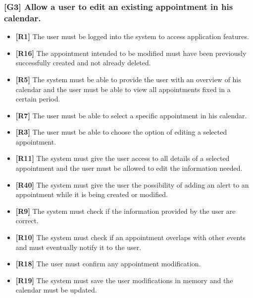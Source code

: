 \subsubsection{[G3] Allow a user to edit an existing appointment in his calendar.}
\begin{itemize}
	\item \textbf{[R1]} The user must be logged into the system to access application features.
	\item \textbf{[R16]} The appointment intended to be modified must have been previously successfully created and not already deleted.
	\item \textbf{[R5]} The system must be able to provide the user with an overview of his calendar and the user must be able to view all appointments fixed in a certain period.
	\item \textbf{[R7]} The user must be able to select a specific appointment in his calendar.
	\item \textbf{[R3]} The user must be able to choose the option of editing a selected appointment.
	\item \textbf{[R11]} The system must give the user access to all details of a selected appointment and the user must be allowed to edit the information needed.
	\item \textbf{[R40]} The system must give the user the possibility of adding an alert to an appointment while it is being created or modified.
	\item \textbf{[R9]} The system must check if the information provided by the user are correct.
	\item \textbf{[R10]} The system must check if an appointment overlaps with other events and must eventually notify it to the user.
	\item \textbf{[R18]} The user must confirm any appointment modification.
	\item \textbf{[R19]} The system must save the user modifications in memory and the calendar must be updated.
\end{itemize}


